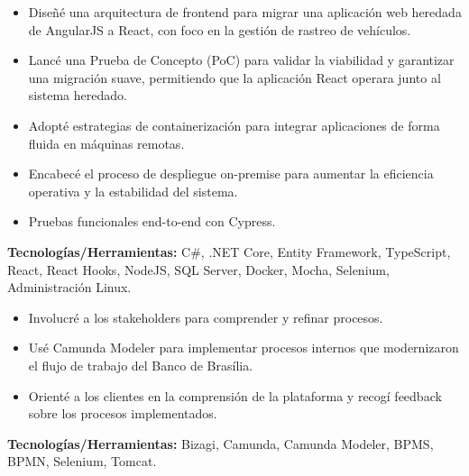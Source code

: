 \documentclass[10pt,a4paper]{altacv}
\begin{document}
\begin{itemize}
    \setlength{\itemindent}{0.5em}
    \item[--] Diseñé una arquitectura de frontend para migrar una aplicación web heredada de AngularJS a React, con foco en la gestión de rastreo de vehículos.
    \item[--] Lancé una Prueba de Concepto (PoC) para validar la viabilidad y garantizar una migración suave, permitiendo que la aplicación React operara junto al sistema heredado.
    \item[--] Adopté estrategias de containerización para integrar aplicaciones de forma fluida en máquinas remotas.
    \item[--] Encabecé el proceso de despliegue on-premise para aumentar la eficiencia operativa y la estabilidad del sistema.
    \item[--] Pruebas funcionales end-to-end con Cypress.
\end{itemize}
\textbf{Tecnologías/Herramientas:} C\#, .NET Core, Entity Framework, TypeScript, React, React Hooks, NodeJS, SQL Server, Docker, Mocha, Selenium, Administración Linux.
\vspace{5mm}

\begin{itemize}
    \setlength{\itemindent}{0.5em}
    \item[--] Involucré a los stakeholders para comprender y refinar procesos.
    \item[--] Usé Camunda Modeler para implementar procesos internos que modernizaron el flujo de trabajo del Banco de Brasília.
    \item[--] Orienté a los clientes en la comprensión de la plataforma y recogí feedback sobre los procesos implementados.
\end{itemize}
\textbf{Tecnologías/Herramientas:} Bizagi, Camunda, Camunda Modeler, BPMS, BPMN, Selenium, Tomcat.
\vspace{5mm}
\end{document}
